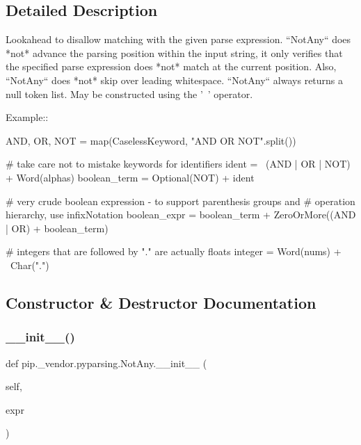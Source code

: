 \subsection{Detailed Description}
\begin{DoxyVerb}Lookahead to disallow matching with the given parse expression.
``NotAny`` does *not* advance the parsing position within the
input string, it only verifies that the specified parse expression
does *not* match at the current position.  Also, ``NotAny`` does
*not* skip over leading whitespace. ``NotAny`` always returns
a null token list.  May be constructed using the '~' operator.

Example::

    AND, OR, NOT = map(CaselessKeyword, "AND OR NOT".split())

    # take care not to mistake keywords for identifiers
    ident = ~(AND | OR | NOT) + Word(alphas)
    boolean_term = Optional(NOT) + ident

    # very crude boolean expression - to support parenthesis groups and
    # operation hierarchy, use infixNotation
    boolean_expr = boolean_term + ZeroOrMore((AND | OR) + boolean_term)

    # integers that are followed by "." are actually floats
    integer = Word(nums) + ~Char(".")
\end{DoxyVerb}
 

\subsection{Constructor \& Destructor Documentation}
\mbox{\label{classpip_1_1__vendor_1_1pyparsing_1_1NotAny_a4787877554c6308b208131f295e55d51}} 
\subsubsection{\texorpdfstring{\+\_\+\+\_\+init\+\_\+\+\_\+()}{\_\_init\_\_()}}
{\footnotesize\ttfamily def pip.\+\_\+vendor.\+pyparsing.\+Not\+Any.\+\_\+\+\_\+init\+\_\+\+\_\+ (\begin{DoxyParamCaption}\item[{}]{self,  }\item[{}]{expr }\end{DoxyParamCaption})}



